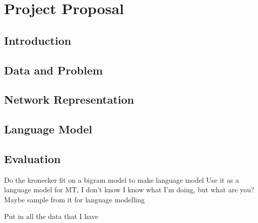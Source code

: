 \documentclass[12pt]{article}
\begin{document}
\section{Project Proposal}

\subsection{Introduction}
\subsection{Data and Problem}
\subsection{Network Representation}
\subsection{Language Model}
\subsection{Evaluation}
Do the kronecker fit on a bigram model to make language model
Use it as a language model for MT, I don't know
I know what I'm doing, but what are you?
Maybe sample from it for language modelling

Put in all the data that I have

\end{document}
